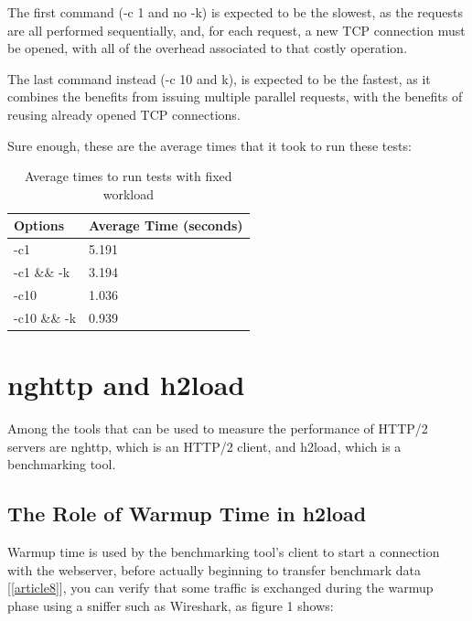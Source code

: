 \documentclass[a4paper,10pt]{article}
\begin{document}
The first command (-c 1 and no -k) is expected to be the slowest, as the requests are all performed sequentially, and, for each request, a new TCP connection must be opened, with all of the overhead associated to that costly operation. 

The last command instead (-c 10 and k), is expected to be the fastest, as it combines the benefits from issuing multiple parallel requests, with the benefits of reusing already opened TCP connections.

Sure enough, these are the average times that it took to run these tests:




\begin{table}[h!]
\centering
\begin{tabular}{|l|l|}
\hline
Options      & Average Time (seconds) \\ \hline
-c1          & 5.191        \\ \hline
-c1 \&\& -k  & 3.194        \\ \hline
-c10         & 1.036        \\ \hline
-c10 \&\& -k & 0.939        \\ \hline



\end{tabular}

\caption{Average times to run tests with fixed workload}
\label{fig:table3}

\end{table}

\clearpage 


\section{nghttp and h2load}
Among the tools that can be used to measure the performance of HTTP/2 servers are nghttp, which is an HTTP/2 client, and h2load, which is a benchmarking tool.

\subsection{The Role of Warmup Time in h2load}

Warmup time is used by the benchmarking tool's client to start a connection with the 
webserver, before actually beginning to transfer benchmark data [\ref{article8}], you can verify that some traffic is exchanged during the warmup phase using a sniffer such as Wireshark, as figure 1 shows: 
\end{document}

